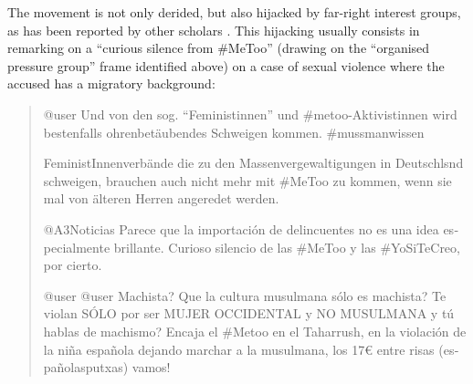 \documentclass[output=paper,english,spanish,german,english]{langsci/langscibook}
\begin{document}
\noindent The \mt movement is not only derided, but also hijacked by far-right interest groups, as has been reported by other scholars \parencites{boyrat19}{wielens19}. This hijacking usually consists in remarking on a \enquote{curious silence from \#MeToo} (drawing on the \enquote{organised pressure group} frame identified above) on a case of sexual violence where the accused has a migratory background:

\begin{quote}\sffamily
  \foreignlanguage{german}{@user Und von den sog. \enquote{Feministinnen} und \#metoo-Aktivistinnen wird bestenfalls ohrenbetäubendes Schweigen kommen. \#mussmanwissen}

  \foreignlanguage{german}{FeministInnenverbände die zu den Massenvergewaltigungen in Deutschlsnd schweigen, brauchen auch nicht mehr mit \#MeToo zu kommen, wenn sie mal von älteren Herren angeredet werden.}

  \foreignlanguage{spanish}{@A3Noticias Parece que la importación de delincuentes no es una idea especialmente brillante. Curioso silencio de las \#MeToo y las \#YoSiTeCreo, por cierto.}

  \foreignlanguage{spanish}{@user @user Machista? Que la cultura musulmana sólo es machista? Te violan SÓLO por ser MUJER OCCIDENTAL y NO MUSULMANA y tú hablas de machismo? Encaja el \#Metoo en el Taharrush, en la violación de la niña española dejando marchar a la musulmana, los 17\euro{} entre risas (españolasputxas) vamos!}
\end{quote}
\end{document}

